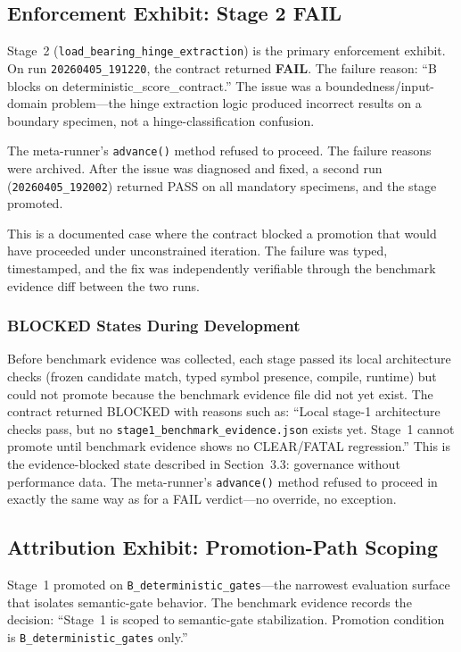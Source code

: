 \documentclass[11pt]{article}
\begin{document}
\subsection{Enforcement Exhibit: Stage 2 FAIL}

Stage~2 (\texttt{load\_bearing\_hinge\_extraction}) is the primary enforcement exhibit. On run \texttt{20260405\_191220}, the contract returned \textbf{FAIL}. The failure reason: ``B blocks on deterministic\_score\_contract.'' The issue was a boundedness/input-domain problem---the hinge extraction logic produced incorrect results on a boundary specimen, not a hinge-classification confusion.

The meta-runner's \texttt{advance()} method refused to proceed. The failure reasons were archived. After the issue was diagnosed and fixed, a second run (\texttt{20260405\_192002}) returned PASS on all mandatory specimens, and the stage promoted.

This is a documented case where the contract blocked a promotion that would have proceeded under unconstrained iteration. The failure was typed, timestamped, and the fix was independently verifiable through the benchmark evidence diff between the two runs.

\subsubsection{BLOCKED States During Development}

Before benchmark evidence was collected, each stage passed its local architecture checks (frozen candidate match, typed symbol presence, compile, runtime) but could not promote because the benchmark evidence file did not yet exist. The contract returned BLOCKED with reasons such as: ``Local stage-1 architecture checks pass, but no \texttt{stage1\_benchmark\_evidence.json} exists yet. Stage~1 cannot promote until benchmark evidence shows no CLEAR/FATAL regression.'' This is the evidence-blocked state described in Section~3.3: governance without performance data. The meta-runner's \texttt{advance()} method refused to proceed in exactly the same way as for a FAIL verdict---no override, no exception.

\subsection{Attribution Exhibit: Promotion-Path Scoping}

Stage~1 promoted on \texttt{B\_deterministic\_gates}---the narrowest evaluation surface that isolates semantic-gate behavior. The benchmark evidence records the decision: ``Stage~1 is scoped to semantic-gate stabilization. Promotion condition is \texttt{B\_deterministic\_gates} only.''
\end{document}
